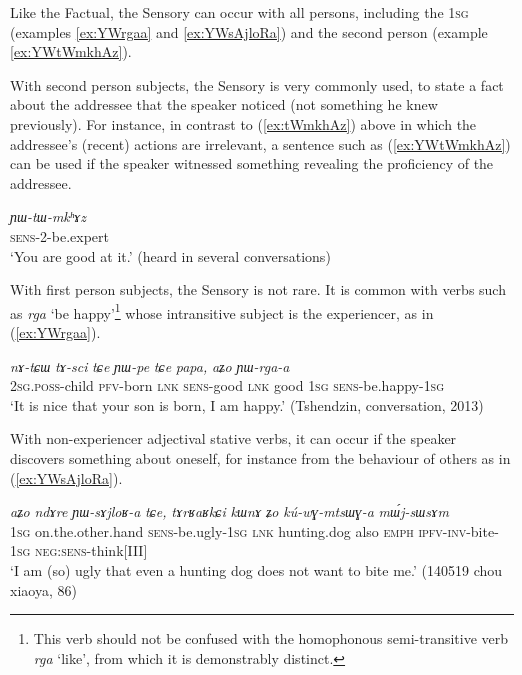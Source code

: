 \documentclass[oldfontcommands,oneside,a4paper,11pt]{article}
\newcommand{\ipa}[1]{{\phon\textit{#1}}} %
\newcommand{\refb}[1]{(\ref{#1})}
\begin{document}
Like the Factual, the Sensory can occur with all persons, including the \textsc{1sg} (examples \ref{ex:YWrgaa} and \ref{ex:YWsAjloRa}) and the second person (example \ref{ex:YWtWmkhAz}).

With second person subjects, the Sensory is very commonly used, to state a fact about the addressee that the speaker noticed (not something he knew previously). For instance, in contrast to \refb{ex:tWmkhAz} above in which the addressee's (recent) actions are irrelevant, a sentence such as \refb{ex:YWtWmkhAz} can be used if the speaker witnessed something revealing the proficiency of the addressee.

\begin{exe}
\ex \label{ex:YWtWmkhAz}
\gll 
 \ipa{ɲɯ-tɯ-mkʰɤz} \\
\textsc{sens}-2-be.expert \\
\glt `You are good at it.' (heard in several conversations)
\end{exe}

With first person subjects, the Sensory is not rare. It is common with verbs such as \ipa{rga} `be happy'\footnote{This verb should not be confused with the homophonous semi-transitive verb \ipa{rga} `like', from which it is demonstrably distinct.} whose intransitive subject is the experiencer, as in \refb{ex:YWrgaa}.

\begin{exe}
\ex \label{ex:YWrgaa}
\gll 
 \ipa{nɤ-tɕɯ}  \ipa{tɤ-sci}  \ipa{tɕe}  \ipa{ɲɯ-pe}  \ipa{tɕe}  \ipa{papa,}  \ipa{aʑo} \ipa{ɲɯ-rga-a} \\
 \textsc{2sg.poss}-child \textsc{pfv}-born \textsc{lnk} \textsc{sens}-good \textsc{lnk} good  \textsc{1sg} \textsc{sens}-be.happy-\textsc{1sg} \\
\glt `It is nice that your son is born, I am happy.' (Tshendzin, conversation, 2013)
\end{exe}

With non-experiencer adjectival stative verbs, it can occur if the speaker discovers something about oneself, for instance from the behaviour of others as in \refb{ex:YWsAjloRa}.

\begin{exe}
\ex \label{ex:YWsAjloRa}
\gll 
\ipa{aʑo} 	\ipa{ndɤre} 	\ipa{ɲɯ-sɤjloʁ-a} 	\ipa{tɕe,} \ipa{tɤrʁaʁkɕi} 	\ipa{kɯnɤ} 	\ipa{ʑo} 	\ipa{kú-wɣ-mtsɯɣ-a} 	\ipa{mɯ́j-sɯsɤm} \\
\textsc{1sg} on.the.other.hand \textsc{sens}-be.ugly-\textsc{1sg} \textsc{lnk} hunting.dog also \textsc{emph} \textsc{ipfv-inv}-bite-\textsc{1sg} \textsc{neg:sens}-think[III] \\
\glt `I am (so) ugly that even a hunting dog does not want to bite me.'  (140519 chou xiaoya, 86)
\end{exe}
\end{document}
